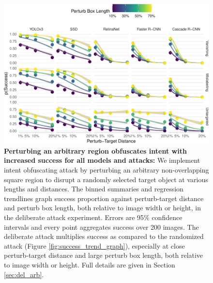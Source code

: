 \begin{figure}[tb]

{\centering \includegraphics[width=1\linewidth]{imgs/arbitrary_trend_graph} 

}

\caption{\textbf{Perturbing an arbitrary region obfuscates intent with increased success for all models and attacks:}  We implement intent obfuscating attack by perturbing an arbitrary non-overlapping square region to disrupt a randomly selected target object at various lengths and distances. The binned summaries and regression trendlines graph success proportion against perturb-target distance and perturb box length, both relative to image width or height, in the deliberate attack experiment. Errors are 95\% confidence intervals and every point aggregates success over 200 images. The deliberate attack multiplies success as compared to the randomized attack (Figure \ref{fig:success_trend_graph}), especially at close perturb-target distance and large perturb box length, both relative to image width or height. Full details are given in Section \ref{sec:del_arb}.}\label{fig:arbitrary_trend_graph}
\end{figure}

\begingroup\fontsize{9}{11}\selectfont

